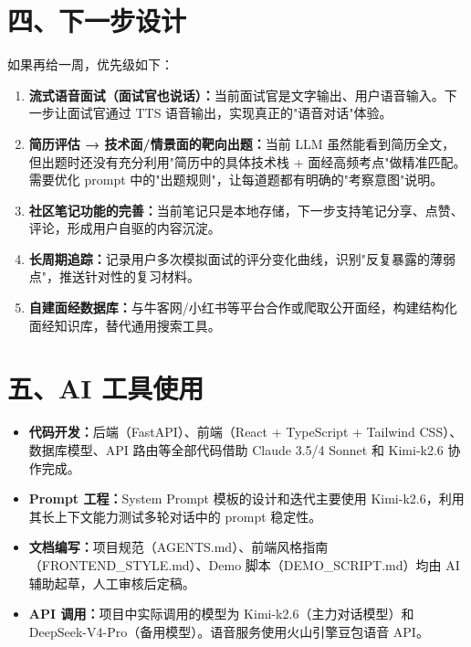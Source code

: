 \documentclass[11pt]{article}
\begin{document}
\section*{四、下一步设计}

如果再给一周，优先级如下：

\begin{enumerate}
    \item \textbf{流式语音面试（面试官也说话）：}当前面试官是文字输出、用户语音输入。下一步让面试官通过 TTS 语音输出，实现真正的"语音对话"体验。
    \item \textbf{简历评估 → 技术面/情景面的靶向出题：}当前 LLM 虽然能看到简历全文，但出题时还没有充分利用"简历中的具体技术栈 + 面经高频考点"做精准匹配。需要优化 prompt 中的"出题规则"，让每道题都有明确的"考察意图"说明。
    \item \textbf{社区笔记功能的完善：}当前笔记只是本地存储，下一步支持笔记分享、点赞、评论，形成用户自驱的内容沉淀。
    \item \textbf{长周期追踪：}记录用户多次模拟面试的评分变化曲线，识别"反复暴露的薄弱点"，推送针对性的复习材料。
    \item \textbf{自建面经数据库：}与牛客网/小红书等平台合作或爬取公开面经，构建结构化面经知识库，替代通用搜索工具。
\end{enumerate}

\section*{五、AI 工具使用}

\begin{itemize}
    \item \textbf{代码开发：}后端（FastAPI）、前端（React + TypeScript + Tailwind CSS）、数据库模型、API 路由等全部代码借助 Claude 3.5/4 Sonnet 和 Kimi-k2.6 协作完成。
    \item \textbf{Prompt 工程：}System Prompt 模板的设计和迭代主要使用 Kimi-k2.6，利用其长上下文能力测试多轮对话中的 prompt 稳定性。
    \item \textbf{文档编写：}项目规范（AGENTS.md）、前端风格指南（FRONTEND\_STYLE.md）、Demo 脚本（DEMO\_SCRIPT.md）均由 AI 辅助起草，人工审核后定稿。
    \item \textbf{API 调用：}项目中实际调用的模型为 Kimi-k2.6（主力对话模型）和 DeepSeek-V4-Pro（备用模型）。语音服务使用火山引擎豆包语音 API。
\end{itemize}
\end{document}
